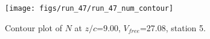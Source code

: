 \begin{figure}[H]
\centering
\texttt{[image: figs/run\_47/run\_47\_num\_contour]}
\caption{Contour plot of $N$ at $z/c$=9.00, $V_{free}$=27.08, station 5.}
\label{fig:run_47_num_contour}
\end{figure}


